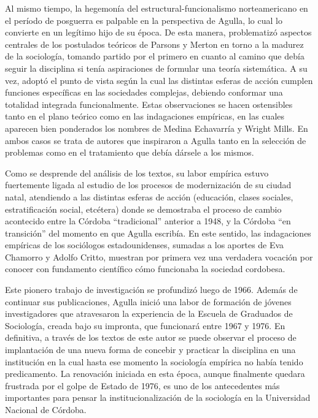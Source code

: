 Al mismo tiempo, la hegemonía del estructural-funcionalismo norteamericano en el período de posguerra es palpable en la perspectiva de Agulla, lo cual lo convierte en un legítimo hijo de su época. De esta manera, problematizó aspectos centrales de los postulados teóricos de Parsons y Merton en torno a la madurez de la sociología, tomando partido por el primero en cuanto al camino que debía seguir la disciplina si tenía aspiraciones de formular una teoría sistemática. A su vez, adoptó el punto de vista según la cual las distintas esferas de acción cumplen funciones específicas en las sociedades complejas, debiendo conformar una totalidad integrada funcionalmente. Estas observaciones se hacen ostensibles tanto en el plano teórico como en las indagaciones empíricas, en las cuales aparecen bien ponderados los nombres de Medina Echavarría y Wright Mills. En ambos casos se trata de autores que inspiraron a Agulla tanto en la selección de problemas como en el tratamiento que debía dársele a los mismos.

Como se desprende del análisis de los textos, su labor empírica estuvo fuertemente ligada al estudio de los procesos de modernización de su ciudad natal, atendiendo a las distintas esferas de acción (educación, clases sociales, estratificación social, etcétera) donde se demostraba el proceso de cambio acontecido entre la Córdoba \enquote{tradicional} anterior a 1948, y la Córdoba \enquote{en transición} del momento en que Agulla escribía. En este sentido, las indagaciones empíricas de los sociólogos estadounidenses, sumadas a los aportes de Eva Chamorro y Adolfo Critto, muestran por primera vez una verdadera vocación por conocer con fundamento científico cómo funcionaba la sociedad cordobesa.

Este pionero trabajo de investigación se profundizó luego de 1966. Además de continuar sus publicaciones, Agulla inició una labor de formación de jóvenes investigadores que atravesaron la experiencia de la Escuela de Graduados de Sociología, creada bajo su impronta, que funcionará entre 1967 y 1976. En definitiva, a través de los textos de este autor se puede observar el proceso de implantación de una nueva forma de concebir y practicar la disciplina en una institución en la cual hasta ese momento la sociología empírica no había tenido predicamento. La renovación iniciada en esta época, aunque finalmente quedara frustrada por el golpe de Estado de 1976, es uno de los antecedentes más importantes para pensar la institucionalización de la sociología en la Universidad Nacional de Córdoba.


